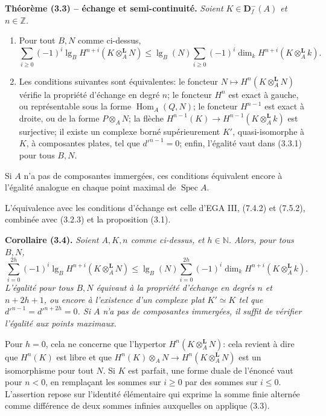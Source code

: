 \documentclass[11pt]{article}
\DeclareMathOperator{\Hom}{Hom}
\DeclareMathOperator{\Spec}{Spec}
\newcommand{\bD}{\mathbf D}
\newcommand{\Z}{\mathbb Z}
\newcommand{\length}{\operatorname{lg}}
\newenvironment{named}[1]{\par\medskip\noindent\textbf{#1}\itshape}{\par\medskip}
\begin{document}
\begin{named}{Théorème (3.3) -- échange et semi-continuité.}
Soient $K\in\bD^-_f(A)$ et $n\in\Z$.
\begin{enumerate}[label=(\roman*)]
\item Pour tout $B,N$ comme ci-dessus,
\begin{equation}\tag{3.3.1}
\sum_{i\ge0}(-1)^i\length_BH^{n+i}(K\otimes_A^\mathbf L N)
\le \length_B(N)\sum_{i\ge0}(-1)^i\dim_kH^{n+i}(K\otimes_A^\mathbf L k).
\end{equation}
\item Les conditions suivantes sont équivalentes: le foncteur $N\mapsto H^n(K\otimes_A^\mathbf L N)$ vérifie la propriété d'échange en degré $n$; le foncteur $H^n$ est exact à gauche, ou représentable sous la forme $\Hom_A(Q,N)$; le foncteur $H^{n-1}$ est exact à droite, ou de la forme $P\otimes_A N$; la flèche $H^{n-1}(K)\to H^{n-1}(K\otimes_A^\mathbf Lk)$ est surjective; il existe un complexe borné supérieurement $K'$, quasi-isomorphe à $K$, à composantes plates, tel que $d'^{n-1}=0$; enfin, l'égalité vaut dans (3.3.1) pour tous $B,N$.
\end{enumerate}
Si $A$ n'a pas de composantes immergées, ces conditions équivalent encore à l'égalité analogue en chaque point maximal de $\Spec A$.
\end{named}
L'équivalence avec les conditions d'échange est celle d'EGA III, (7.4.2) et (7.5.2), combinée avec (3.2.3) et la proposition (3.1).

\begin{named}{Corollaire (3.4).}
Soient $A,K,n$ comme ci-dessus, et $h\in\mathbb N$. Alors, pour tous $B,N$,
\begin{equation}\tag{3.4.1}
\sum_{i=0}^{2h}(-1)^i\length_BH^{n+i}(K\otimes_A^\mathbf L N)
\le \length_B(N)\sum_{i=0}^{2h}(-1)^i\dim_kH^{n+i}(K\otimes_A^\mathbf L k).
\end{equation}
L'égalité pour tous $B,N$ équivaut à la propriété d'échange en degrés $n$ et $n+2h+1$, ou encore à l'existence d'un complexe plat $K'\simeq K$ tel que $d'^{n-1}=d'^{n+2h}=0$. Si $A$ n'a pas de composantes immergées, il suffit de vérifier l'égalité aux points maximaux.
\end{named}
Pour $h=0$, cela ne concerne que l'hypertor $H^n(K\otimes_A^\mathbf L N)$: cela revient à dire que $H^n(K)$ est libre et que $H^n(K)\otimes_A N\to H^n(K\otimes_A^\mathbf L N)$ est un isomorphisme pour tout $N$. Si $K$ est parfait, une forme duale de l'énoncé vaut pour $n<0$, en remplaçant les sommes sur $i\ge0$ par des sommes sur $i\le0$. L'assertion repose sur l'identité élémentaire qui exprime la somme finie alternée comme différence de deux sommes infinies auxquelles on applique (3.3).
\end{document}
